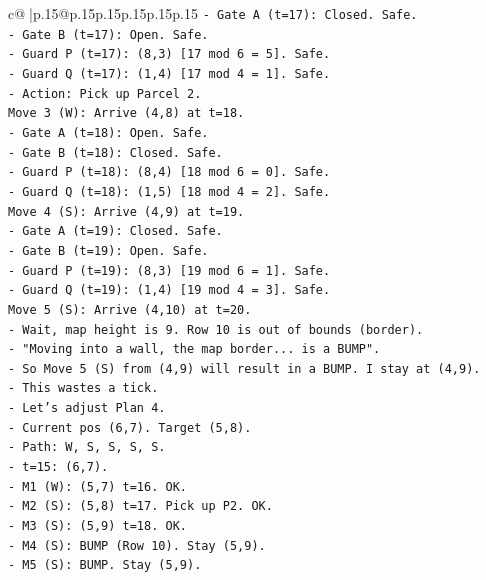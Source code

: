 \documentclass{article}
\begin{document}
{\begin{supertabular}{c@{$\;$}|p{.15\linewidth}@{}p{.15\linewidth}p{.15\linewidth}p{.15\linewidth}p{.15\linewidth}p{.15\linewidth}}
{{{\texttt{{-} Gate A (t=17): Closed. Safe.} \\
\texttt{{-} Gate B (t=17): Open. Safe.} \\
\texttt{{-} Guard P (t=17): (8,3) {[}17 mod 6 = 5{]}. Safe.} \\
\texttt{{-} Guard Q (t=17): (1,4) {[}17 mod 4 = 1{]}. Safe.} \\
\texttt{{-} Action: Pick up Parcel 2.} \\
\texttt{Move 3 (W): Arrive (4,8) at t=18.} \\
\texttt{{-} Gate A (t=18): Open. Safe.} \\
\texttt{{-} Gate B (t=18): Closed. Safe.} \\
\texttt{{-} Guard P (t=18): (8,4) {[}18 mod 6 = 0{]}. Safe.} \\
\texttt{{-} Guard Q (t=18): (1,5) {[}18 mod 4 = 2{]}. Safe.} \\
\texttt{Move 4 (S): Arrive (4,9) at t=19.} \\
\texttt{{-} Gate A (t=19): Closed. Safe.} \\
\texttt{{-} Gate B (t=19): Open. Safe.} \\
\texttt{{-} Guard P (t=19): (8,3) {[}19 mod 6 = 1{]}. Safe.} \\
\texttt{{-} Guard Q (t=19): (1,4) {[}19 mod 4 = 3{]}. Safe.} \\
\texttt{Move 5 (S): Arrive (4,10) at t=20.} \\
\texttt{{-} Wait, map height is 9. Row 10 is out of bounds (border).} \\
\texttt{{-} "Moving into a wall, the map border... is a BUMP".} \\
\texttt{{-} So Move 5 (S) from (4,9) will result in a BUMP. I stay at (4,9).} \\
\texttt{{-} This wastes a tick.} \\
\texttt{{-} Let's adjust Plan 4.} \\
\texttt{{-} Current pos (6,7). Target (5,8).} \\
\texttt{{-} Path: W, S, S, S, S.} \\
\texttt{{-} t=15: (6,7).} \\
\texttt{{-} M1 (W): (5,7) t=16. OK.} \\
\texttt{{-} M2 (S): (5,8) t=17. Pick up P2. OK.} \\
\texttt{{-} M3 (S): (5,9) t=18. OK.} \\
\texttt{{-} M4 (S): BUMP (Row 10). Stay (5,9).} \\
\texttt{{-} M5 (S): BUMP. Stay (5,9).} \\
}}}
\end{supertabular}}
\end{document}
